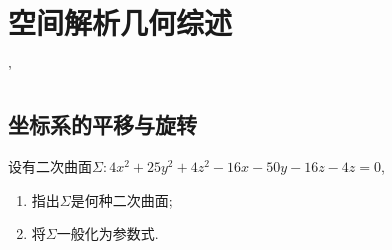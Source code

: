 \setcounter{chapter}{4}
\chapter{空间解析几何综述}'

\section{坐标系的平移与旋转}

\begin{example}
    设有二次曲面$\Sigma:4x^2+25y^2+4z^2-16x-50y-16z-4z=0$,

    \begin{enumerate}
        \item 指出$\Sigma$是何种二次曲面;
        \item 将$\Sigma$一般化为参数式.
    \end{enumerate}
\end{example}\

